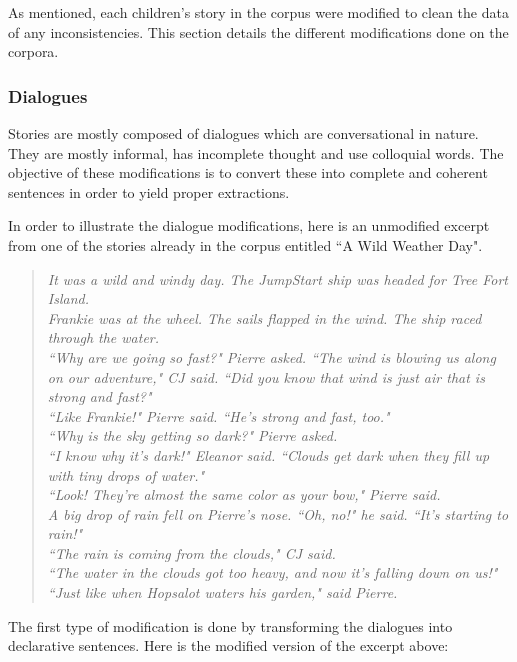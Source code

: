 As mentioned, each children's story in the corpus were modified to clean the data of any inconsistencies. This section details the different modifications done on the corpora.

\subsubsection*{Dialogues}

Stories are mostly composed of dialogues which are conversational in nature. They are mostly informal, has incomplete thought and use colloquial words. The objective of these modifications is to convert these into complete and coherent sentences in order to yield proper extractions.

In order to illustrate the dialogue modifications, here is an unmodified excerpt from one of the stories already in the corpus entitled ``A Wild Weather Day".

\begin{verse}
\itshape
It was a wild and windy day. The JumpStart ship was headed for Tree Fort Island. \\
Frankie was at the wheel. The sails flapped in the wind. The ship raced through the water. \\
``Why are we going so fast?" Pierre asked. ``The wind is blowing us along on our adventure," CJ said. ``Did you know that wind is just air that is strong and fast?" \\
``Like Frankie!" Pierre said. ``He's strong and fast, too." \\
``Why is the sky getting so dark?" Pierre asked. \\
``I know why it's dark!" Eleanor said. ``Clouds get dark when they fill up with tiny drops of water." \\
``Look! They're almost the same color as your bow," Pierre said. \\
A big drop of rain fell on Pierre's nose. ``Oh, no!" he said. ``It's starting to rain!" \\
``The rain is coming from the clouds," CJ said. \\
``The water in the clouds got too heavy, and now it's falling down on us!" \\
``Just like when Hopsalot waters his garden," said Pierre. \\
\end{verse}

The first type of modification is done by transforming the dialogues into declarative sentences. Here is the modified version of the excerpt above:

